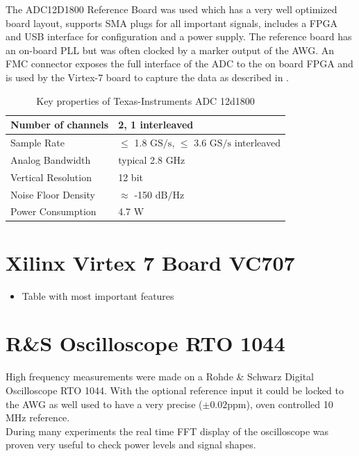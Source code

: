 The ADC12D1800 Reference Board was used which has a very well optimized board
layout, supports \acrshort{SMA} plugs for all important signals, includes a
\gls{FPGA} and \gls{USB} interface for configuration and a power supply.
The reference board has an on-board \gls{PLL} but was often clocked by a marker
output of the \gls{AWG}.
An \gls{FMC} connector exposes the full interface of the \gls{ADC} to
the on board \gls{FPGA} and is used by the Virtex-7 board to capture the data
as described in . \\

\begin{table}[h]
  \centering
  \begin{tabular}{|l|l|}
    \hline
    Number of channels & 2, 1 interleaved \\ \hline
    Sample Rate & $\leq$ 1.8 $\text{GS}/\text{s}$, $\leq$ 3.6 $\text{GS}/\text{s}$ interleaved \\ \hline
    Analog Bandwidth & typical 2.8 GHz \\ \hline
    Vertical Resolution & 12 bit \\ \hline
    Noise Floor Density & $\approx$ -150 $\text{dB}/\text{Hz}$ \\ \hline
    Power Consumption & 4.7 W \\ \hline
  \end{tabular}
  \caption{Key properties of Texas-Instruments ADC 12d1800}
  \label{tab:awg}
\end{table}

\section{Xilinx Virtex 7 Board VC707}
\label{sec:comp_virtex7}
\begin{itemize}
\item Table with most important features
\end{itemize}

\section{R\&S Oscilloscope RTO 1044}
\label{sec:comp_osci}
High frequency measurements were made on a Rohde \& Schwarz Digital
Oscilloscope RTO 1044. With the optional reference input it could be locked
to the \gls{AWG} as well used to have a very precise ($\pm 0.02 \text{ppm}$),
oven controlled 10 MHz reference. \\

During many experiments the real time \gls{FFT} display of the oscilloscope was
proven very useful to check power levels and signal shapes. \\

